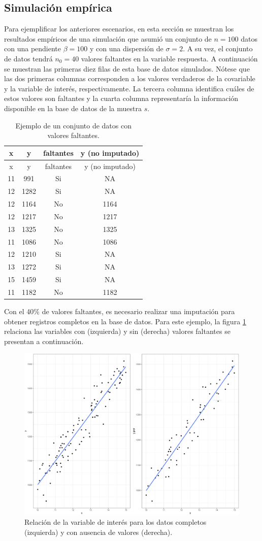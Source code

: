\documentclass[
  12pt,
]{book}
\begin{document}
\hypertarget{simulaciuxf3n-empuxedrica}{%
\subsection{Simulación empírica}\label{simulaciuxf3n-empuxedrica}}

Para ejemplificar los anteriores escenarios, en esta sección se muestran los resultados empíricos de una simulación que asumió un conjunto de \(n = 100\) datos con una pendiente \(\beta = 100\) y con una dispersión de \(\sigma = 2\). A su vez, el conjunto de datos tendrá \(n_0 = 40\) valores faltantes en la variable respuesta. A continuación se muestran las primeras diez filas de esta base de datos simulados. Nótese que las dos primeras columnas corresponden a los valores verdaderos de la covariable y la variable de interés, respectivamente. La tercera columna identifica cuáles de estos valores son faltantes y la cuarta columna representaría la información disponible en la base de datos de la muestra \(s\).

\begin{longtable}[]{@{}cccc@{}}
\caption{Ejemplo de un conjunto de datos con valores faltantes.}\tabularnewline
\toprule()
x & y & faltantes & y (no imputado) \\
\midrule()
\endfirsthead
\toprule()
x & y & faltantes & y (no imputado) \\
\midrule()
\endhead
11 & 991 & Si & NA \\
12 & 1282 & Si & NA \\
12 & 1164 & No & 1164 \\
12 & 1217 & No & 1217 \\
13 & 1325 & No & 1325 \\
11 & 1086 & No & 1086 \\
12 & 1210 & Si & NA \\
13 & 1272 & Si & NA \\
15 & 1459 & Si & NA \\
11 & 1182 & No & 1182 \\
\bottomrule()
\end{longtable}

Con el 40\% de valores faltantes, es necesario realizar una imputación para obtener registros completos en la base de datos. Para este ejemplo, la figura \ref{fig:figim1} relaciona las variables con (izquierda) y sin (derecha) valores faltantes se presentan a continuación.

\begin{figure}
\includegraphics[width=0.5\linewidth]{Pics/im1} \caption{Relación de la variable de interés para los datos completos (izquierda) y con ausencia de valores (derecha).}\label{fig:figim1}
\end{figure}
\end{document}
